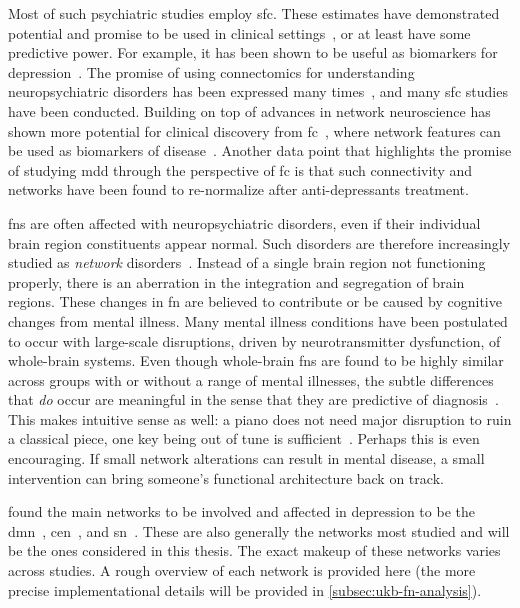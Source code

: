 Most of such psychiatric studies employ \gls{sfc}.
These estimates have demonstrated potential and promise to be used in clinical settings~\parencite{Cole2014, Deco2014, Parkes2020}, or at least have some predictive power.
For example, it has been shown to be useful as biomarkers for depression~\parencite{Drysdale2017}.
The promise of using connectomics for understanding neuropsychiatric disorders has been expressed many times~\parencite{Deco2014}, and many \gls{sfc} studies have been conducted.
Building on top of advances in network neuroscience has shown more potential for clinical discovery from \gls{fc}~\parencite{Lydon-Staley2018}, where network features can be used as biomarkers of disease~\parencite{Bassett2009}.
Another data point that highlights the promise of studying \gls{mdd} through the perspective of \gls{fc} is that such connectivity and networks have been found to re-normalize after anti-depressants treatment.

\Glspl{fn} are often affected with neuropsychiatric disorders, even if their individual brain region constituents appear normal.
Such disorders are therefore increasingly studied as \emph{network} disorders~\parencite[see][for a review on depression]{Mulders2015}.
Instead of a single brain region not functioning properly, there is an aberration in the integration and segregation of brain regions.
These changes in \gls{fn} are believed to contribute or be caused by cognitive changes from mental illness.
Many mental illness conditions have been postulated to occur with large-scale disruptions, driven by neurotransmitter dysfunction, of whole-brain systems.
Even though whole-brain \glspl{fn} are found to be highly similar across groups with or without a range of mental illnesses, the subtle differences that \emph{do} occur are meaningful in the sense that they are predictive of diagnosis~\parencite{Spronk2020}.
This makes intuitive sense as well: a piano does not need major disruption to ruin a classical piece, one key being out of tune is sufficient~\parencite[see also][for a discussion of small effect sizes]{Paulus2019}.
Perhaps this is even encouraging.
If small network alterations can result in mental disease, a small intervention can bring someone's functional architecture back on track.

\textcite{Mulders2015} found the main networks to be involved and affected in depression to be the \gls{dmn}~\parencite{Berman2011, Demirtas2016, Wise2017, Yan2019, Zhao2019, Zhou2020}, \gls{cen}~\parencite{Zhao2019}, and \gls{sn}~\parencite{Manoliu2014}.
These are also generally the networks most studied and will be the ones considered in this thesis.
The exact makeup of these networks varies across studies.
A rough overview of each network is provided here (the more precise implementational details will be provided in \cref{subsec:ukb-fn-analysis}).

